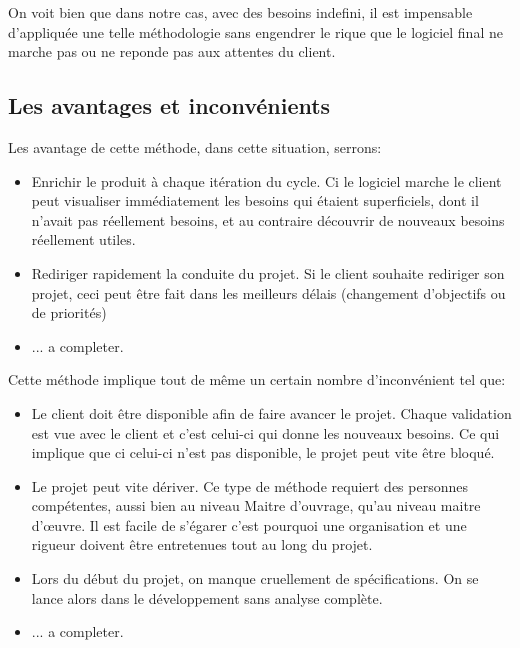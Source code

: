 On voit bien que dans notre cas, avec des besoins indefini, il est impensable d'appliquée une telle méthodologie sans engendrer le rique que le logiciel final ne marche pas ou ne reponde pas aux attentes du client.

\subsection{Les avantages et inconvénients}
Les avantage de cette méthode, dans cette situation, serrons:
\begin{itemize}
    \item Enrichir le produit à chaque itération du cycle. Ci le logiciel marche le client peut visualiser immédiatement les besoins qui étaient superficiels, dont il n'avait pas réellement besoins, et au contraire découvrir de nouveaux besoins réellement utiles.
    \item Rediriger rapidement la conduite du projet. Si le client souhaite rediriger son projet, ceci peut être fait dans les meilleurs délais (changement d'objectifs ou de priorités)
    \item ... a completer.
\end{itemize}\medskip
 
Cette méthode implique tout de même un certain nombre d'inconvénient tel que:
\begin{itemize}
    \item Le client doit être disponible afin de faire avancer le projet. Chaque validation est vue avec le client et c'est celui-ci qui donne les nouveaux besoins. Ce qui implique que ci celui-ci n'est pas disponible, le projet peut vite être bloqué. 
    \item Le projet peut vite dériver. Ce type de méthode requiert des personnes compétentes, aussi bien au niveau Maitre d'ouvrage, qu'au niveau maitre d'œuvre. Il est facile de s'égarer c'est pourquoi une organisation et une rigueur doivent être entretenues tout au long du projet.
    \item Lors du début du projet, on manque cruellement de spécifications. On se lance alors dans le développement sans analyse complète.    
    \item ... a completer.
\end{itemize}\medskip







    
